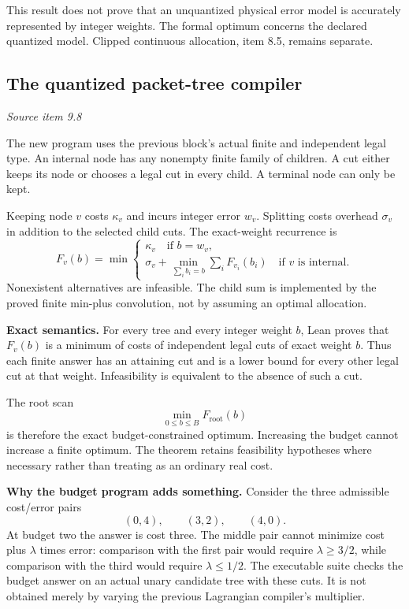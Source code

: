 This result does not prove that an unquantized physical error model is accurately represented by integer weights. The formal optimum concerns the declared quantized model. Clipped continuous allocation, item 8.5, remains separate.



\subsection{The quantized packet-tree compiler}\label{supp3:subsection:005}\textit{Source item 9.8}\par
The new program uses the previous block's actual finite  and independent legal  type. An internal node has any nonempty finite family of children. A cut either keeps its node or chooses a legal cut in every child. A terminal node can only be kept.

Keeping node $v$ costs $\kappa_v$ and incurs integer error $w_v$. Splitting costs overhead $\sigma_v$ in addition to the selected child cuts. The exact-weight recurrence is
\[
F_v(b)=\min\left\{
\begin{array}{l}
\kappa_v\quad\text{if }b=w_v,\\[2pt]
\displaystyle\sigma_v+
\min_{\sum_i b_i=b}\sum_iF_{v_i}(b_i)\quad\text{if }v\text{ is internal}.
\end{array}\right.
\]
Nonexistent alternatives are infeasible. The child sum is implemented by the proved finite min-plus convolution, not by assuming an optimal allocation.

\textbf{Exact semantics.} For every tree and every integer weight $b$, Lean proves that $F_v(b)$ is a minimum of costs of independent legal cuts of exact weight $b$. Thus each finite answer has an attaining cut and is a lower bound for every other legal cut at that weight. Infeasibility is equivalent to the absence of such a cut.

The root scan
\[
\boxed{\min_{0\leq b\leq B}F_{\mathrm{root}}(b)}
\]
is therefore the exact budget-constrained optimum. Increasing the budget cannot increase a finite optimum. The theorem retains feasibility hypotheses where necessary rather than treating  as an ordinary real cost.

\textbf{Why the budget program adds something.} Consider the three admissible cost/error pairs
\[
(0,4),\qquad(3,2),\qquad(4,0).
\]
At budget two the answer is cost three. The middle pair cannot minimize cost plus $\lambda$ times error: comparison with the first pair would require $\lambda\geq3/2$, while comparison with the third would require $\lambda\leq1/2$. The executable suite checks the budget answer on an actual unary candidate tree with these cuts. It is not obtained merely by varying the previous Lagrangian compiler's multiplier.

